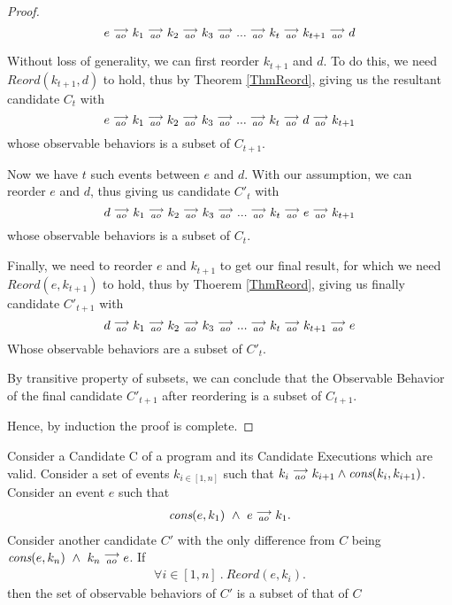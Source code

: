 \begin{proof}
        \[
            e\stackrel{\longrightarrow}{_{ao}}k_1\stackrel{\longrightarrow}{_{ao}}k_2\stackrel{\longrightarrow}{_{ao}}k_3\stackrel{\longrightarrow}{_{ao}}...\stackrel{\longrightarrow}{_{ao}}k_t\stackrel{\longrightarrow}{_{ao}}k_{t+1}\stackrel{\longrightarrow}{_{ao}}d  
        \]

        Without loss of generality, we can first reorder $k_{t+1}$ and $d$. To do this, we need $Reord(k_{t+1}, d)$ to hold, thus by Theorem \ref{ThmReord}, giving us the resultant candidate $C_t$ with  
        \[
            e\stackrel{\longrightarrow}{_{ao}}k_1\stackrel{\longrightarrow}{_{ao}}k_2\stackrel{\longrightarrow}{_{ao}}k_3\stackrel{\longrightarrow}{_{ao}}...\stackrel{\longrightarrow}{_{ao}}k_t\stackrel{\longrightarrow}{_{ao}}d\stackrel{\longrightarrow}{_{ao}}k_{t+1}  
        \]
        whose observable behaviors is a subset of $C_{t+1}$. 

        Now we have $t$ such events between $e$ and $d$. With our assumption, we can reorder $e$ and $d$, thus giving us candidate $C'_t$ with 
        \[
            d\stackrel{\longrightarrow}{_{ao}}k_1\stackrel{\longrightarrow}{_{ao}}k_2\stackrel{\longrightarrow}{_{ao}}k_3\stackrel{\longrightarrow}{_{ao}}...\stackrel{\longrightarrow}{_{ao}}k_t\stackrel{\longrightarrow}{_{ao}}e\stackrel{\longrightarrow}{_{ao}}k_{t+1}  
        \]
        whose observable behaviors is a subset of $C_{t}$. 

        Finally, we need to reorder $e$ and $k_{t+1}$ to get our final result, for which we need $Reord(e, k_{t+1})$ to hold, thus by Thoerem \ref{ThmReord},  giving us finally candidate $C'_{t+1}$ with
        \[
            d\stackrel{\longrightarrow}{_{ao}}k_1\stackrel{\longrightarrow}{_{ao}}k_2\stackrel{\longrightarrow}{_{ao}}k_3\stackrel{\longrightarrow}{_{ao}}...\stackrel{\longrightarrow}{_{ao}}k_t\stackrel{\longrightarrow}{_{ao}}k_{t+1}\stackrel{\longrightarrow}{_{ao}}e  
        \]
        Whose observable behaviors are a subset of $C'_t$. 

        By transitive property of subsets, we can conclude that the Observable Behavior of the final candidate $C'_{t+1}$ after reordering is a subset of $C_{t+1}$.

        Hence, by induction the proof is complete. 
\end{proof}
    
\begin{corollary}
    \label{CorollCodeMotion1}
    Consider a Candidate C of a program and its Candidate Executions which are valid. Consider a set of events $k_{i \in[1,n]}$ such that $k_i\stackrel{\longrightarrow}{_{ao}}k_{i+1} \wedge \textit{cons}(k_i,k_{i+1})$.
    Consider an event $e$ such that 
    \begin{align*}
        \textit{cons}(e,k_1) \ \wedge \ e\stackrel{\longrightarrow}{_{ao}}k_1.  
    \end{align*}
    Consider another candidate $C'$ with the only difference from $C$ being $\cons{e}{k_n} \ \wedge \ \reln{k_n}{ao}{e}$.
    If 
    \begin{align*}
        \forall i \in [1,n] \ . \ Reord(e,k_i).
    \end{align*}
    then the set of observable behaviors of $C'$ is a subset of that of $C$  
\end{corollary}

